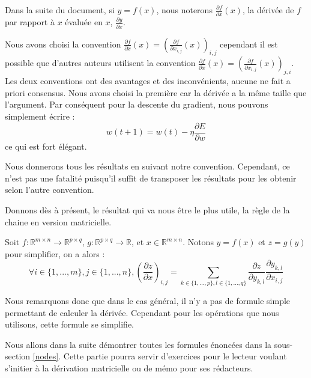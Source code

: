 \begin{remark}
Dans la suite du document, si $y = f(x)$, nous noterons $\frac{\partial f}{\partial x}(x)$, la dérivée de $f$ par rapport à $x$ évaluée en $x$, $\frac{\partial y}{\partial x}$.
\end{remark}

\begin{remark}
Nous avons choisi la convention $\frac{\partial f}{\partial x}(x) = (\frac{\partial f}{\partial x_{i, j}}(x))_{i, j}$ cependant il est possible que d'autres auteurs utilisent la convention $\frac{\partial f}{\partial x}(x) = (\frac{\partial f}{\partial x_{i, j}}(x))_{j, i}$. Les deux conventions ont des avantages et des inconvénients, aucune ne fait a priori consensus. Nous avons choisi la première car la dérivée a la même taille que l'argument. Par conséquent pour la descente du gradient, nous pouvons simplement écrire :
$$
w(t+1) = w(t) - \eta \frac{\partial E}{\partial w} 
$$
ce qui est fort élégant.

Nous donnerons tous les résultats en suivant notre convention. Cependant, ce n'est pas une fatalité puisqu'il suffit de transposer les résultats pour les obtenir selon l'autre convention.
\end{remark}

Donnons dès à présent, le résultat qui va nous être le plus utile, la règle de la chaine en version matricielle.

\begin{proposition}
Soit $f : \mathbb{R}^{m \times n} \rightarrow \mathbb{R}^{p \times q}$, $g : \mathbb{R}^{p \times q} \rightarrow \mathbb{R}$, et $x \in \mathbb{R}^{m \times n}$. Notons $y = f(x)$ et $z = g(y)$ pour simplifier, on a alors :
$$
\forall i \in \{1, ..., m\}, j \in \{1, ..., n\}, (\frac{\partial z}{\partial x})_{i, j} = \sum_{k \in \{1, ..., p\}, l \in \{1, ..., q\}}{\frac{\partial z}{\partial y_{k, l}}\frac{\partial y_{k, l}}{\partial x_{i, j}}}
$$
\end{proposition}

Nous remarquons donc que dans le cas général, il n'y a pas de formule simple permettant de calculer la dérivée. Cependant pour les opérations que nous utilisons, cette formule se simplifie.

Nous allons dans la suite démontrer toutes les formules énoncées dans la sous-section \ref{nodes}. Cette partie pourra servir d'exercices pour le lecteur voulant s'initier à la dérivation matricielle ou de mémo pour ses rédacteurs.

